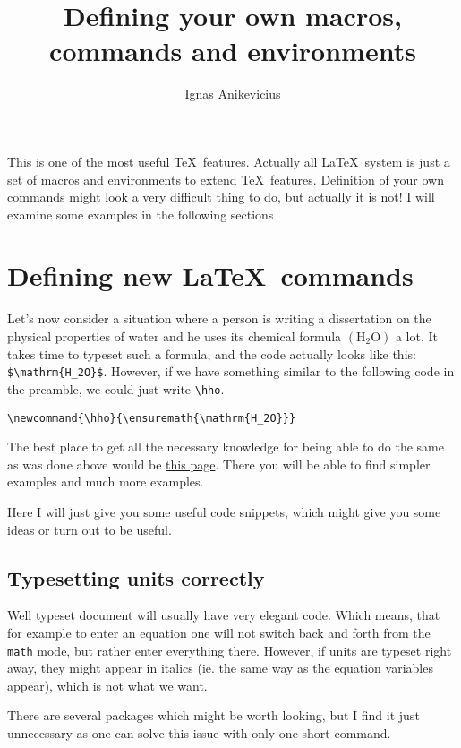 \documentclass[
    draft
]{scrartcl}
\title{Defining your own macros, commands and environments}
\author{Ignas Anikevicius}
\newcommand{\hho}{\ensuremath{\mathrm{H_2O}}}
\begin{document}
\maketitle
\tableofcontents
\listoftodos

This is one of the most useful \TeX\ features. Actually all \LaTeX\ system
is just a set of macros and environments to extend \TeX\ features.
Definition of your own commands might look a very difficult thing to do, but
actually it is not! I will examine some examples in the following sections

\section{Defining new \LaTeX\ commands}

Let's now consider a situation where a person is writing a dissertation on the
physical properties of water and he uses its chemical formula $\left( \hho
\right)$ a lot. It takes time to typeset such a formula, and the code actually
looks like this: \verb|$\mathrm{H_2O}$|. However, if we have
something similar to the following code in the preamble, we could just write
\verb|\hho|.
\begin{lstlisting}
\newcommand{\hho}{\ensuremath{\mathrm{H_2O}}}
\end{lstlisting}

The best place to get all the necessary knowledge for being able to do the same
as was done above would be 
\href{https://secure.wikimedia.org/wikibooks/en/wiki/LaTeX/Customizing_LaTeX#New_commands}{this
page}. There you will be able to find simpler examples and much more examples.

Here I will just give you some useful code snippets, which might give you some
ideas or turn out to be useful.

\subsection{Typesetting units correctly}

Well typeset document will usually have very elegant code. Which means, that for
example to enter an equation one will not switch back and forth from the
\verb|math| mode, but rather enter everything there. However, if units are
typeset right away, they might appear in italics (ie. the same way as the
equation variables appear), which is not what we want.

There are several packages which might be worth looking, but I find it just
unnecessary as one can solve this issue with only one short command.
\end{document}
